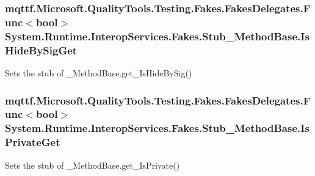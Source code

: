 \hypertarget{class_system_1_1_runtime_1_1_interop_services_1_1_fakes_1_1_stub___method_base_a2916cad00b6e7a8d6d26d98ede443983}{
\subsubsection[{Is\-Hide\-By\-Sig\-Get}]{\setlength{\rightskip}{0pt plus 5cm}mqttf.\-Microsoft.\-Quality\-Tools.\-Testing.\-Fakes.\-Fakes\-Delegates.\-Func$<$bool$>$ System.\-Runtime.\-Interop\-Services.\-Fakes.\-Stub\-\_\-\-Method\-Base.\-Is\-Hide\-By\-Sig\-Get}}\label{class_system_1_1_runtime_1_1_interop_services_1_1_fakes_1_1_stub___method_base_a2916cad00b6e7a8d6d26d98ede443983}


Sets the stub of \-\_\-\-Method\-Base.\-get\-\_\-\-Is\-Hide\-By\-Sig()

\hypertarget{class_system_1_1_runtime_1_1_interop_services_1_1_fakes_1_1_stub___method_base_aa253b2599fe9528a66f27269564659fc}{
\subsubsection[{Is\-Private\-Get}]{\setlength{\rightskip}{0pt plus 5cm}mqttf.\-Microsoft.\-Quality\-Tools.\-Testing.\-Fakes.\-Fakes\-Delegates.\-Func$<$bool$>$ System.\-Runtime.\-Interop\-Services.\-Fakes.\-Stub\-\_\-\-Method\-Base.\-Is\-Private\-Get}}\label{class_system_1_1_runtime_1_1_interop_services_1_1_fakes_1_1_stub___method_base_aa253b2599fe9528a66f27269564659fc}


Sets the stub of \-\_\-\-Method\-Base.\-get\-\_\-\-Is\-Private()

